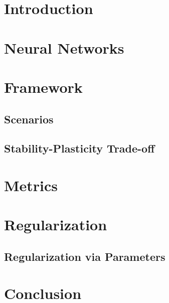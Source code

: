 \documentclass[12pt]{article}
\begin{document}
	\newpage
	\tableofcontents
	
	\newpage
	
	
	
	\section{Introduction}
	\label{intro}
	
	\section{Neural Networks}
	\label{nn}
	
	\section{Framework}
	\label{framework}
	
	\subsection{Scenarios}
	\label{scenarios}
	
	\subsection{Stability-Plasticity Trade-off}
	\label{cf}
	
	\section{Metrics}
	\label{metrics}
	
	\section{Regularization}
	\label{reg0}
	
	\subsection{Regularization via Parameters}
	\label{reg01}
	
	\section{Conclusion}
	\label{conclusion}
	
	
\end{document}
